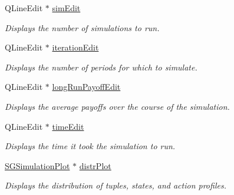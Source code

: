 \begin{DoxyCompactItemize}
\mbox{\label{classSGSimulationHandler_a3505994e5e4f02a340b7927b6d3433c6}} 
Q\+Line\+Edit $\ast$ \hyperlink{classSGSimulationHandler_a3505994e5e4f02a340b7927b6d3433c6}{sim\+Edit}
\begin{DoxyCompactList}\small\item\em Displays the number of simulations to run. \end{DoxyCompactList}\item 
\mbox{\label{classSGSimulationHandler_ab42965599854d67f7043d30aa4661667}} 
Q\+Line\+Edit $\ast$ \hyperlink{classSGSimulationHandler_ab42965599854d67f7043d30aa4661667}{iteration\+Edit}
\begin{DoxyCompactList}\small\item\em Displays the number of periods for which to simulate. \end{DoxyCompactList}\item 
\mbox{\label{classSGSimulationHandler_a72359d29b018d9c0e5969476d6691bd3}} 
Q\+Line\+Edit $\ast$ \hyperlink{classSGSimulationHandler_a72359d29b018d9c0e5969476d6691bd3}{long\+Run\+Payoff\+Edit}
\begin{DoxyCompactList}\small\item\em Displays the average payoffs over the course of the simulation. \end{DoxyCompactList}\item 
\mbox{\label{classSGSimulationHandler_aca7a15debc3506010a2d338521d3d11e}} 
Q\+Line\+Edit $\ast$ \hyperlink{classSGSimulationHandler_aca7a15debc3506010a2d338521d3d11e}{time\+Edit}
\begin{DoxyCompactList}\small\item\em Displays the time it took the simulation to run. \end{DoxyCompactList}\item 
\mbox{\label{classSGSimulationHandler_a29aa8ceb03ad06a27d2d6396541f1613}} 
\hyperlink{classSGSimulationPlot}{S\+G\+Simulation\+Plot} $\ast$ \hyperlink{classSGSimulationHandler_a29aa8ceb03ad06a27d2d6396541f1613}{distr\+Plot}
\begin{DoxyCompactList}\small\item\em Displays the distribution of tuples, states, and action profiles. \end{DoxyCompactList}\item 

\end{DoxyCompactItemize}
